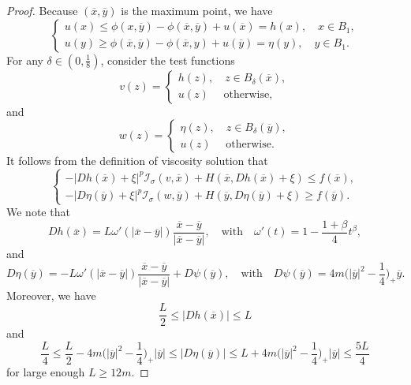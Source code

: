 \documentclass[11pt,reqno]{amsart}
\numberwithin{equation}{section}
\begin{document}
\begin{proof}
Because $(\overline{x},\overline{y})$ is the maximum point, we have
\begin{equation}
\label{3-1-3}
\begin{cases}
u(x)\le \phi(x,\overline{y})-\phi(\overline{x},\overline{y})+u(\overline{x})=h(x),\quad  x\in B_1,\\
u(y)\ge \phi(\overline{x},\overline{y})-\phi(\overline{x},y)+u(\overline{y})=\eta(y),\quad  y\in B_1.
\end{cases}
\end{equation}
For any $\delta\in\left(0,\frac{1}{8}\right)$, consider the test functions
\begin{equation*}
v(z)=\begin{cases}h(z),\quad z\in B_\delta(\overline{x}),\\
u(z)\quad  \text{ otherwise},
\end{cases}
\end{equation*}
and
\begin{equation*}
w(z)=\begin{cases}\eta(z),  \quad z\in B_\delta(\overline{y}),\\
u(z) \quad\text{ otherwise}.
\end{cases}
\end{equation*}
It follows from the definition of viscosity solution that
\begin{equation}
\label{3-1-3-1}
\begin{cases}
-|Dh(\overline{x})+\xi|^p\mathcal{I}_\sigma(v,\overline{x})+H(\overline{x},Dh(\overline{x})+\xi)\le f(\overline{x}),\\
-|D\eta(\overline{y})+\xi|^p\mathcal{I}_\sigma(w,\overline{y})+H(\overline{y},D\eta(\overline{y})+\xi)\ge f(\overline{y}).
\end{cases}
\end{equation}
We note that
$$
Dh(\overline{x})=L\omega'(|\overline{x}-\overline{y}|)\frac{\overline{x}-\overline{y}}{|\overline{x}-\overline{y}|},
 \quad\text{with}\quad \omega'(t)=1-\frac{1+\beta}{4}t^\beta,
$$
and
$$
D\eta(\overline{y})=-L\omega'(|\overline{x}-\overline{y}|)\frac{\overline{x}-\overline{y}}{|\overline{x}-\overline{y}|}+D\psi(\overline{y}),
\quad\text{with}\quad D\psi(\overline{y})=4m\Big(|\overline{y}|^2-\frac{1}{4}\Big)_+\overline{y}.
$$
Moreover, we have
\begin{equation}
\label{3-1-3-2}
\frac{L}{2}\le|Dh(\overline{x})|\le L
\end{equation}
and
\begin{equation}
\label{3-1-3-3}
\frac{L}{4}\le\frac{L}{2}-4m\Big(|\overline{y}|^2-\frac{1}{4}\Big)_+|\overline{y}|\le|D\eta(\overline{y})|\le L+4m\Big(|\overline{y}|^2-\frac{1}{4}\Big)_+|\overline{y}|\le\frac{5L}{4}
\end{equation}
for large enough $L\ge12m$.


\end{proof}
\end{document}
